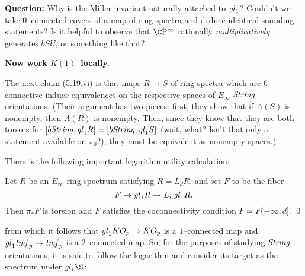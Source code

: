 \textbf{Question:} Why is the Miller invariant naturally attached to $\mathit{gl}_1$?  Couldn't we take $0$--connected covers of a map of ring spectra and deduce identical-sounding statements?  Is it helpful to observe that $\CP^\infty$ rationally \emph{multiplicatively} generates $bSU$, or something like that?




\textbf{Now work $K(1)$--locally.}


The next claim (5.19.vi) is that maps $R \to S$ of ring spectra which are $6$--connective induce equivalences on the respective spaces of $E_\infty$ $\mathit{String}$--orientations.  (Their argument has two pieces: first, they show that if $A(S)$ is nonempty, then $A(R)$ is nonempty.  Then, since they know that they are both torsors for $[b\mathit{String}, \mathit{gl}_1 R] = [b\mathit{String}, \mathit{gl}_1 S]$ (wait, what? Isn't that only a statement available on $\pi_0$?), they must be equivalent as nonempty spaces.)

There is the following important logarithm utility calculation:

\begin{theorem}
Let $R$ be an $E_\infty$ ring spectrum satisfying $R = L_d R$, and set $F$ to be the fiber \[F \to \mathit{gl}_1 R \to L_n \mathit{gl}_1 R.\]  Then $\pi_* F$ is torsion and $F$ satisfies the coconnectivity condition $F \simeq F(-\infty, d]$. \qed
\end{theorem}

\noindent from which it follows that $\mathit{gl}_1 KO_p \to KO_p$ is a $1$--connected map and $\mathit{gl}_1 \mathit{tmf}_p \to \mathit{tmf}_p$ is a $2$--connected map.  So, for the purposes of studying $\mathit{String}$ orientations, it is safe to follow the logarithm and consider its target as the spectrum under $\gl_1 \S$:
\begin{center}
\end{center}

